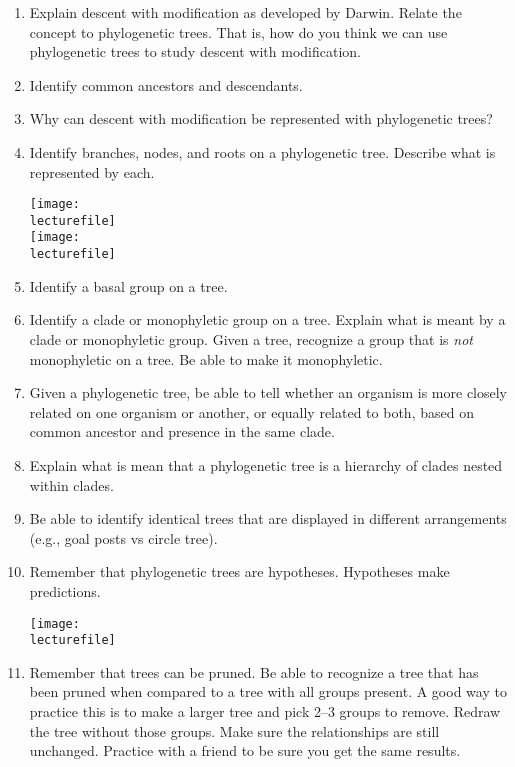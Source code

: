 \documentclass[letterpaper]{tufte-handout}
\newcommand\lecturefile{163_lecture08_fullsize}
\begin{document}
\begin{enumerate}

	\item Explain descent with modification as developed by Darwin. Relate the concept to phylogenetic trees. That is, how do you think we can use phylogenetic trees to study descent with modification. 

	\item Identify common ancestors and descendants.

	\item Why can descent with modification be represented with phylogenetic trees? 

	\item Identify branches, nodes, and roots on a phylogenetic tree. Describe what is represented by each.

	\begin{marginfigure}[0.75in]
		\texttt{[image: \\lecturefile]}\\
		\texttt{[image: \\lecturefile]}
	\end{marginfigure}

	\item Identify a basal group on a tree.

	\item Identify a clade or monophyletic group on a tree. Explain what is meant by a clade or monophyletic group. Given a tree, recognize a group that is \emph{not} monophyletic on a tree.  Be able to make it monophyletic.

	\item Given a phylogenetic tree, be able to tell whether an organism is more closely related on one organism or another, or equally related to both, based on common ancestor and presence in the same clade. 

	\item Explain what is mean that a phylogenetic tree is a hierarchy of clades nested within clades.

	\item Be able to identify identical trees that are displayed in different arrangements (e.g., goal posts vs circle tree).

	\item Remember that phylogenetic trees are hypotheses. Hypotheses make predictions.
\begin{marginfigure}[0.75in]
	\texttt{[image: \\lecturefile]}
\end{marginfigure}

	\item Remember that trees can be pruned. Be able to recognize a tree that has been pruned when compared to a tree with all groups present. A good way to practice this is to make a larger tree and pick 2--3 groups to remove. Redraw the tree without those groups. Make sure the relationships are still unchanged. Practice with a friend to be sure you get the same results.


\end{enumerate}
\end{document}
